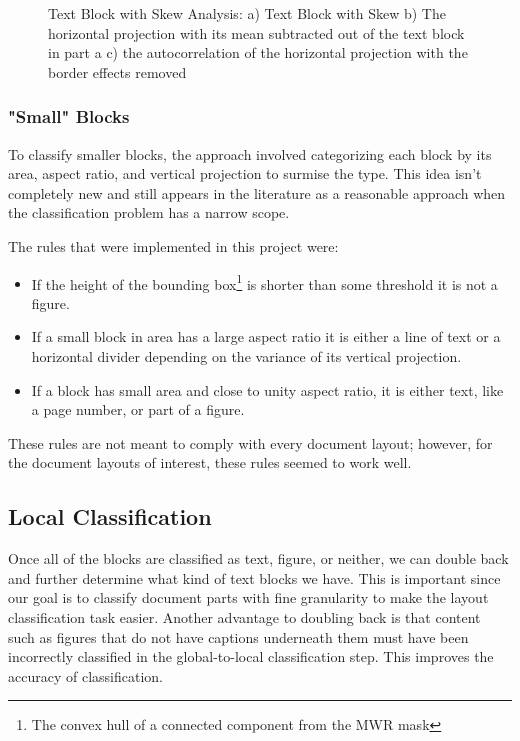 \documentclass{report}
\begin{document}
\begin{figure}
\begin{subfigure}{.33\columnwidth}
\label{textauto}
\end{subfigure}
\caption{Text Block with Skew Analysis: a) Text Block with Skew b) The horizontal projection with its mean subtracted out of the text block in part a c) the autocorrelation of the horizontal projection with the border effects removed}
\label{textskew}
\end{figure}


\subsubsection{"Small" Blocks}
To classify smaller blocks, the approach involved categorizing each block by its area, aspect ratio, and vertical projection to surmise the type. This idea isn't completely new and still appears in the literature \cite{Classification} as a reasonable approach when the classification problem has a narrow scope.

The rules that were implemented in this project were:

\begin{itemize}
\item If the height of the bounding box\footnote{The convex hull of a connected component from the MWR mask} is shorter than some threshold it is not a figure.
\item If a small block in area has a large aspect ratio it is either a line of text or a horizontal divider depending on the variance of its vertical projection.
\item If a block has small area and close to unity aspect ratio, it is either text, like a page number, or part of a figure.
\end{itemize}


These rules are not meant to comply with every document layout; however, for the document layouts of interest, these rules seemed to work well.


\subsection{Local Classification}
Once all of the blocks are classified as text, figure, or neither, we can double back and further determine what kind of text blocks we have. This is important since our goal is to classify document parts with fine granularity to make the layout classification task easier. Another advantage to doubling back is that content such as figures that do not have captions underneath them must have been incorrectly classified in the global-to-local classification step. This improves the accuracy of classification.
\end{document}
